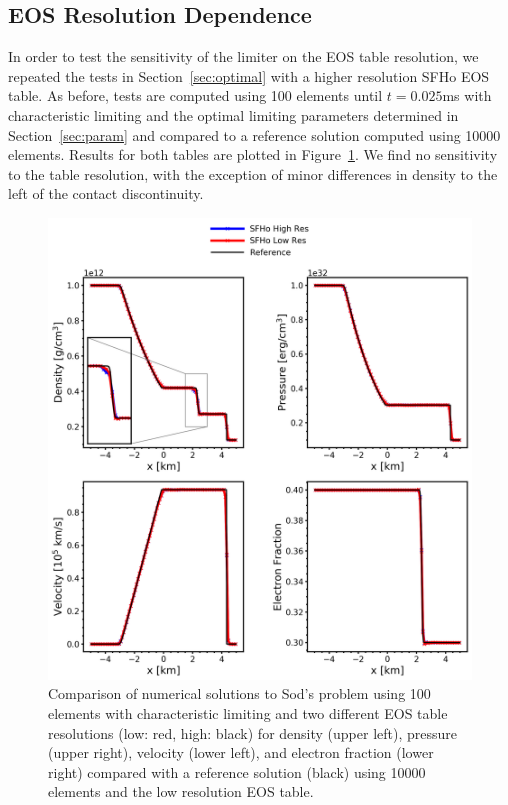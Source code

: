\documentclass[onecolumn]{aastex62}
\begin{document}
\subsection{EOS Resolution Dependence}
\label{sec:eosRes}
In order to test the sensitivity of the limiter on the EOS table resolution,
we repeated the tests in Section~\ref{sec:optimal} with a higher resolution
SFHo EOS table. As before, tests are computed using 100 elements until
$t = 0.025$ms with characteristic limiting and the optimal limiting parameters determined in
Section~\ref{sec:param} and compared to a reference solution computed using
10000 elements. Results for both tables are plotted in Figure~\ref{fig:SodSedovSFHoRes}.
We find no sensitivity to the table resolution, with the exception of
minor differences in density to the left of the contact discontinuity.
\begin{figure}[h!]
  \centering
  \includegraphics[width=36pc]{./figures/eos_res.png}
  \caption{\label{fig:SodSedovSFHoRes} Comparison of numerical solutions to
  Sod's problem using 100 elements with characteristic limiting and two
  different EOS table resolutions (low: red, high: black) for density (upper left), pressure (upper right),
  velocity (lower left), and electron fraction (lower right)
  compared with a reference solution (black) using 10000 elements and the low resolution EOS table.}
\end{figure}
\end{document}
